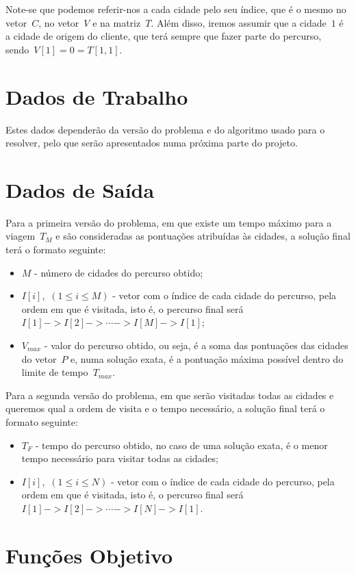 \documentclass[12pt,a4paper,reqno]{report}
\numberwithin{figure}{section}
\numberwithin{equation}{section}
\begin{document}
Note-se que podemos referir-nos a cada cidade pelo seu índice, que é o mesmo no vetor~$C$, no vetor~$V$ e na matriz~$T$. Além disso, iremos assumir que a cidade~$1$ é a cidade de origem do cliente, que terá sempre que fazer parte do percurso, sendo~$V[1] = 0 = T[1,1]$.

\section{Dados de Trabalho}

Estes dados dependerão da versão do problema e do algoritmo usado para o resolver, pelo que serão apresentados numa próxima parte do projeto.

\section{Dados de Saída}

Para a primeira versão do problema, em que existe um tempo máximo para a viagem~$T_M$ e são consideradas as pontuações atribuídas às cidades, a solução final terá o formato seguinte:
\begin{itemize}
	\item $M$ - número de cidades do percurso obtido;
	\item $I[i]$,~$(1 \leq i \leq M)$ - vetor com o índice de cada cidade do percurso, pela ordem em que é visitada, isto é, o percurso final será~$I[1] -> I[2] -> \cdots -> I[M] -> I[1]$;
	\item $V_{max}$ - valor do percurso obtido, ou seja, é a soma das pontuações das cidades do vetor~$P$ e, numa solução exata, é a pontuação máxima possível dentro do limite de tempo~$T_{max}$.
\end{itemize}

Para a segunda versão do problema, em que serão visitadas todas as cidades e queremos qual a ordem de visita e o tempo necessário, a solução final terá o formato seguinte:
\begin{itemize}
	\item $T_F$ - tempo do percurso obtido, no caso de uma solução exata, é o menor tempo necessário para visitar todas as cidades;
	\item $I[i]$,~$(1 \leq i \leq N)$ - vetor com o índice de cada cidade do percurso, pela ordem em que é visitada, isto é, o percurso final será~$I[1] -> I[2] -> \cdots -> I[N] -> I[1]$.
\end{itemize}

\section{Funções Objetivo}
\end{document}
